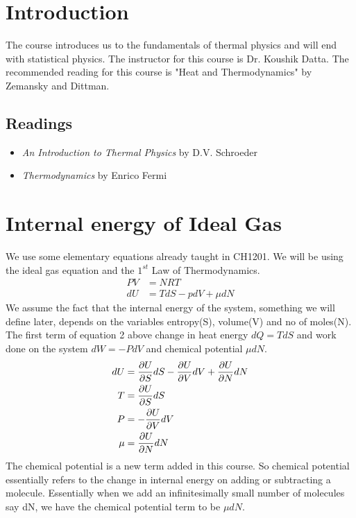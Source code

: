     \section{Introduction} 
    The course introduces us to the fundamentals of thermal physics and will end with statistical physics. The instructor for this course is Dr. Koushik Datta. 
    The recommended reading for this course is "Heat and Thermodynamics" by Zemansky and Dittman. 
    \subsection{Readings} 
    \begin{itemize}
        \item \emph{An Introduction to Thermal Physics } by D.V. Schroeder
        \item \emph{Thermodynamics} by Enrico Fermi
    \end{itemize}
    
    
    \section{Internal energy of Ideal Gas}
    We use some elementary equations already taught in CH1201. We will be using the ideal gas 
    equation and the $1^{st}$ Law of Thermodynamics. 
    \begin{align*}
        PV &= NRT \\ 
        dU &= TdS - pdV + \mu dN
    \end{align*}
    We assume the fact that the internal energy of the system, something we will define later,
    depends on the variables entropy(S), volume(V) and no of moles(N). The first term of equation
    2 above change in heat energy $dQ = TdS$ and work done on the system $dW = -PdV$ and 
    chemical potential $\mu dN$. 
    \begin{align}
        dU &= \pdv{U}{S}dS - \pdv{U}{V}dV + \pdv{U}{N}dN \\ 
        T &= \pdv{U}{S}dS\\ 
        P &= - \pdv{U}{V}dV \\ 
        \mu &= \pdv{U}{N}dN 
    \end{align}
    The chemical potential is a new term added in this course. %
    So chemical potential essentially refers to the change in internal energy on adding or 
    subtracting a molecule. Essentially when we add an infinitesimally small number of molecules
    say dN, we have the chemical potential term to be $\mu dN$.%
    
